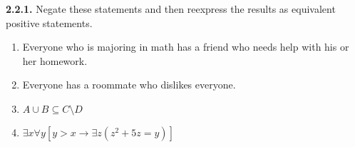 \documentclass[12pt]{amsart}
\newenvironment{statement}[1]{\smallskip\noindent\color[rgb]{.6627, .3529, .6314} {\bf #1.}}{}
\theoremstyle{definition}
\theoremstyle{remark}
\begin{document}
\begin{statement}{2.2.1}
Negate these statements and then reexpress the results as equivalent positive statements.
\begin{enumerate}
	\item Everyone who is majoring in math has a friend who needs help with his or her homework.
	
	\item Everyone has a roommate who dislikes everyone.
	
	\item $A \cup B \subseteq C \setminus D$
	
	\item $\exists x \forall y [y > x \rightarrow \exists z (z^2 + 5z = y)]$
\end{enumerate}
\end{statement}
\end{document}
